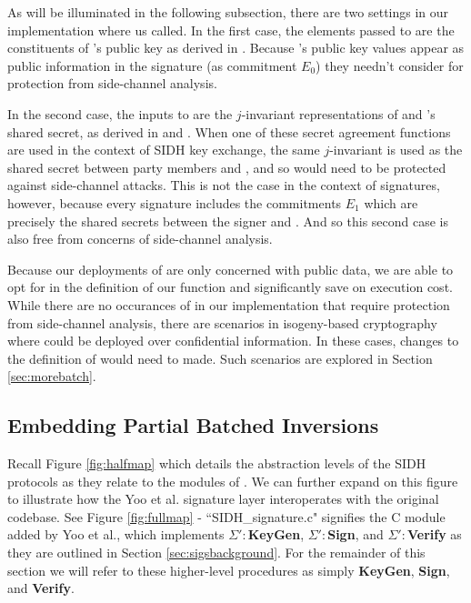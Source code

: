 As will be illuminated in the following subsection, there are two settings in our implementation where  us called. In the first case, the elements passed to  are the constituents of \randall's public key as derived in . Because \randall's public key values appear as public information in the signature (as commitment $E_0$) they needn't consider for protection from side-channel analysis. 

In the second case, the inputs to  are the $j$-invariant representations of \bob and \randall's shared secret, as derived in  and .  When one of these secret agreement functions are used in the context of SIDH key exchange, the same $j$-invariant is used as the shared secret between party members \ba and \rb, and so would need to be protected against side-channel attacks. This is not the case in the context of signatures, however, because every signature includes the commitments $E_1$ which are precisely the shared secrets between the signer and \randall. And so this second case is also free from concerns of side-channel analysis.

Because our deployments of \pbinv are only concerned with public data, we are able to opt for  in the definition of our function and significantly save on execution cost. While there are no occurances of \pbinv in our implementation that require protection from side-channel analysis, there are scenarios in isogeny-based cryptography where  could be deployed over confidential information. In these cases, changes to the definition of \pbinv would need to made. Such scenarios are explored in Section \ref{sec:morebatch}. 

\subsection{Embedding Partial Batched Inversions}

Recall Figure \ref{fig:halfmap} which details the abstraction levels of the SIDH protocols as they relate to the modules of \sidh. We can further expand on this figure to illustrate how the Yoo et al. signature layer interoperates with the original \sidh codebase. See Figure \ref{fig:fullmap} - ``SIDH\_signature.c" signifies the C module added by Yoo et al., which implements $\Sigma':$\textbf{KeyGen}, $\Sigma':$\textbf{Sign}, and $\Sigma':$\textbf{Verify} as they are outlined in Section \ref{sec:sigsbackground}. For the remainder of this section we will refer to these higher-level procedures as simply \textbf{KeyGen}, \textbf{Sign}, and \textbf{Verify}.

